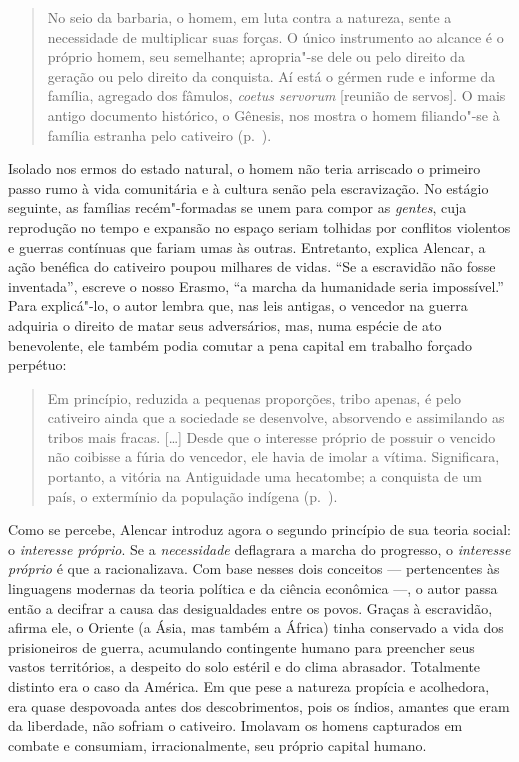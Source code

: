 \begin{quote}
No seio da barbaria, o homem, em luta contra a natureza, sente a
necessidade de multiplicar suas forças. O único instrumento ao alcance
é o próprio homem, seu semelhante; apropria"-se dele ou pelo direito
da geração ou pelo direito da conquista. Aí está o gérmen rude e
informe da família, agregado dos fâmulos, \textit{coetus servorum}
[reunião de servos]. O mais antigo documento histórico, o Gênesis, nos
mostra o homem filiando"-se à  família estranha pelo cativeiro
(p.~\pageref{barbaria}). 
\end{quote}

Isolado nos ermos do estado natural, o homem não teria arriscado o
primeiro passo rumo à  vida comunitária e à  cultura senão pela
escravização. No estágio seguinte, as famílias recém"-formadas se unem
para compor as \textit{gentes}, cuja reprodução no tempo e expansão no
espaço seriam tolhidas por conflitos violentos e guerras contínuas que
fariam umas às outras. Entretanto, explica Alencar, a ação benéfica do
cativeiro poupou milhares de vidas. ``Se a escravidão não fosse
inventada'', escreve o nosso Erasmo, ``a marcha da humanidade seria
impossível.'' Para explicá"-lo, o autor lembra que, nas leis antigas, o
vencedor na guerra adquiria o direito de matar seus adversários, mas,
numa espécie de ato benevolente, ele também podia comutar a pena
capital em trabalho forçado perpétuo: 

\begin{quote}
Em princípio, reduzida a pequenas proporções, tribo apenas, é pelo
cativeiro ainda que a sociedade se desenvolve, absorvendo e assimilando
as tribos mais fracas. [\ldots{}] 
Desde que o interesse próprio de possuir o vencido não coibisse a fúria
do vencedor, ele havia de imolar a vítima. Significara, portanto, a
vitória na Antiguidade uma hecatombe; a conquista de um país, o
extermínio da população indígena (p.~\pageref{hecatombe}). 
\end{quote}

Como se percebe, Alencar introduz agora o segundo princípio de sua
teoria social: o \textit{interesse próprio}. Se a \textit{necessidade}
deflagrara a marcha do progresso, o \textit{interesse próprio} é que a
racionalizava. Com base nesses dois conceitos --- pertencentes às
linguagens modernas da teoria política e da ciência econômica ---, o
autor passa então a decifrar a causa das desigualdades entre os povos.
Graças à  escravidão, afirma ele, o Oriente (a Ásia, mas também a
África) tinha conservado a vida dos prisioneiros de guerra, acumulando
contingente humano para preencher seus vastos territórios, a despeito
do solo estéril e do clima abrasador. Totalmente distinto era o caso da
América. Em que pese a natureza propícia e acolhedora, era quase
despovoada antes dos descobrimentos, pois os índios, amantes que eram
da liberdade, não sofriam o cativeiro. Imolavam os homens capturados em
combate e consumiam, irracionalmente, seu próprio capital humano. 

